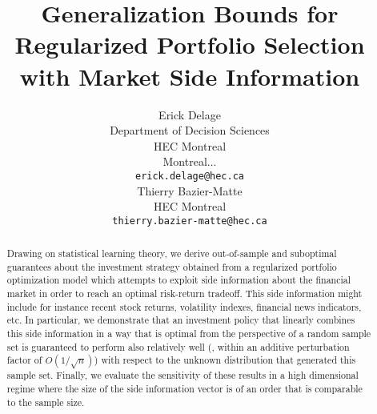 \documentclass{article}
\title{Generalization Bounds for Regularized Portfolio Selection with Market Side Information}
\author{
  Erick Delage\\
  Department of Decision Sciences\\
  HEC Montreal\\
  Montreal...\\
  \texttt{erick.delage@hec.ca}\\
  \And
  Thierry Bazier-Matte\\
  HEC Montreal\\
  \texttt{thierry.bazier-matte@hec.ca}\\
}
\begin{document}
\maketitle

\begin{abstract}
  Drawing on statistical learning theory, we derive out-of-sample and suboptimal
  guarantees about the investment strategy obtained from a regularized portfolio
  optimization model which attempts to exploit side information about the financial market
  in order to reach an optimal risk-return tradeoff. This side information might include
  for instance recent stock returns, volatility indexes, financial news indicators,
  etc. In particular, we demonstrate that an investment policy that linearly combines this
  side information in a way that is optimal from the perspective of a random sample set is
  guaranteed to perform also relatively well (\ie, within an additive perturbation factor
  of $O(1/\sqrt{n})$) with respect to the unknown distribution that generated this sample
  set. Finally, we evaluate the sensitivity of these results in a high dimensional regime
  where the size of the side information vector is of an order that is comparable to the
  sample size.

\end{abstract}



% 





\end{document}
